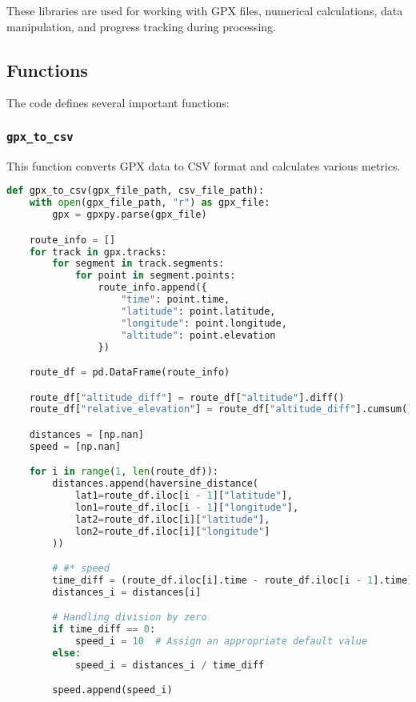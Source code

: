 These libraries are used for working with GPX files, numerical calculations, data manipulation, and progress tracking during processing.

\subsection{Functions}

The code defines several important functions:

\subsubsection{\texttt{gpx\_to\_csv}}

This function converts GPX data to CSV format and calculates various metrics.

\begin{lstlisting}[language=Python]
def gpx_to_csv(gpx_file_path, csv_file_path):
    with open(gpx_file_path, "r") as gpx_file:
        gpx = gpxpy.parse(gpx_file)

    route_info = []
    for track in gpx.tracks:
        for segment in track.segments:
            for point in segment.points:
                route_info.append({
                    "time": point.time,
                    "latitude": point.latitude,
                    "longitude": point.longitude,
                    "altitude": point.elevation
                })

    route_df = pd.DataFrame(route_info)

    route_df["altitude_diff"] = route_df["altitude"].diff()
    route_df["relative_elevation"] = route_df["altitude_diff"].cumsum()

    distances = [np.nan]
    speed = [np.nan]

    for i in range(1, len(route_df)):
        distances.append(haversine_distance(
            lat1=route_df.iloc[i - 1]["latitude"],
            lon1=route_df.iloc[i - 1]["longitude"],
            lat2=route_df.iloc[i]["latitude"],
            lon2=route_df.iloc[i]["longitude"]
        ))

        # #* speed
        time_diff = (route_df.iloc[i].time - route_df.iloc[i - 1].time).seconds
        distances_i = distances[i]

        # Handling division by zero
        if time_diff == 0:
            speed_i = 10  # Assign an appropriate default value
        else:
            speed_i = distances_i / time_diff

        speed.append(speed_i)


\end{lstlisting}
